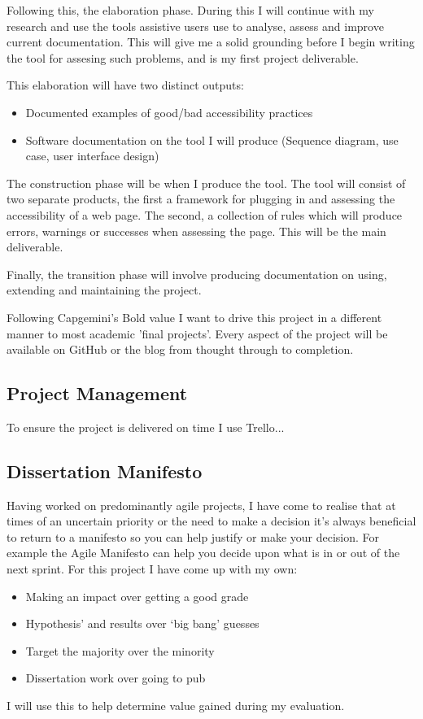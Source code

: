 Following this, the elaboration phase. During this I will continue with my research and use the tools assistive users use to analyse,
assess and improve current documentation. This will give me a solid grounding before I begin writing the tool for assesing such problems,
 and is my first project deliverable.

This elaboration will have two distinct outputs:
\begin{itemize}
  \item Documented examples of good/bad accessibility practices
  \item Software documentation on the tool I will produce (Sequence diagram, use case, user interface design)
\end{itemize}

The construction phase will be when I produce the tool. The tool will consist of two separate products, the first a framework for plugging
in and assessing the accessibility of a web page. The second, a collection of rules which will produce errors, warnings or successes when
assessing the page. This will be the main deliverable.

Finally, the transition phase will involve producing documentation on using, extending and maintaining the project.

Following Capgemini's Bold value I want to drive this project in a different manner to most academic 'final projects'. Every aspect of the
project will be available on GitHub or the blog from thought through to completion.

\subsection{Project Management}
To ensure the project is delivered on time I use Trello...

\subsection{Dissertation Manifesto}
Having worked on predominantly agile projects, I have come to realise that at times of an uncertain priority or the need to make a decision
it’s always beneficial to return to a manifesto so you can help justify or make your decision. For example the Agile Manifesto can help you
decide upon what is in or out of the next sprint. For this project I have come up with my own:
\begin{itemize}
  \item Making an impact over getting a good grade
  \item Hypothesis’ and results over ‘big bang’ guesses
  \item Target the majority over the minority
  \item Dissertation work over going to pub
\end{itemize}
I will use this to help determine value gained during my evaluation.

